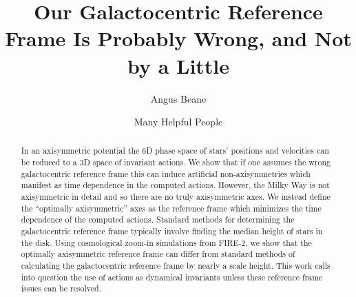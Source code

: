 \documentclass[twocolumn]{aastex62}
\begin{document}
\title{Our Galactocentric Reference Frame Is Probably Wrong, and Not by a
Little}


\author{Angus Beane}

\author{Many Helpful People}
\noaffiliation

\begin{abstract}

In an axisymmetric potential the 6D phase space of stars' positions and
velocities can be reduced to a 3D space of invariant actions. We show that if
one assumes the wrong galactocentric reference frame this can induce
artificial non-axisymmetries which manifest as time dependence in the
computed actions. However, the Milky Way is not axisymmetric in detail and so
there are no truly axisymmetric axes. We instead define the  ``optimally
axisymmetric'' axes as the reference frame which minimizes the time
dependence of the computed actions. Standard methods for determining the
galactocentric reference frame typically involve finding the median height of
stars in the disk. Using cosmological zoom-in simulations from FIRE-2, we
show that the optimally axisymmetric reference frame can differ from standard
methods of calculating the galactocentric reference frame by nearly a scale
height. This work calls into question the use of actions as dynamical
invariants unless these reference frame issues can be resolved.



\end{abstract}
\end{document}
